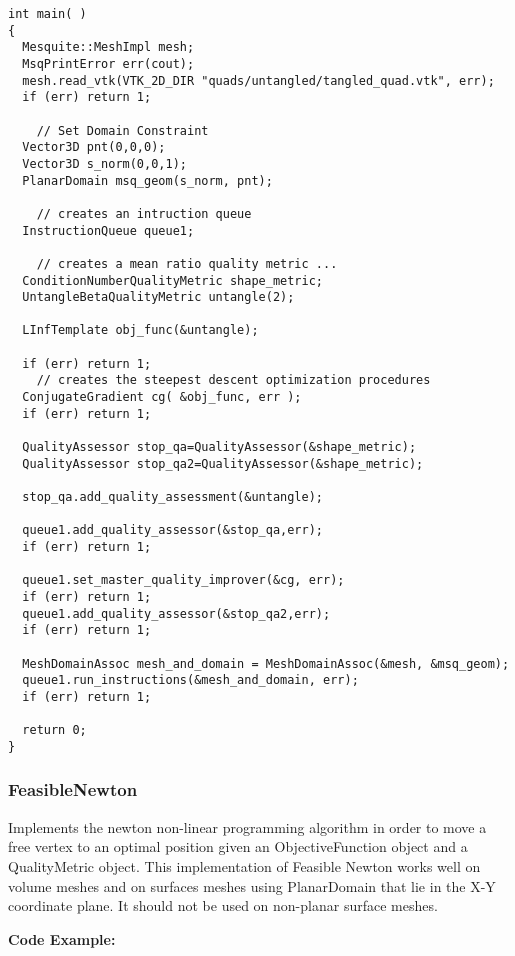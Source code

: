 \begin{lstlisting}[frame=single]
int main( )
{
  Mesquite::MeshImpl mesh;
  MsqPrintError err(cout);
  mesh.read_vtk(VTK_2D_DIR "quads/untangled/tangled_quad.vtk", err);
  if (err) return 1;
  
    // Set Domain Constraint
  Vector3D pnt(0,0,0);
  Vector3D s_norm(0,0,1);
  PlanarDomain msq_geom(s_norm, pnt);
                                                                              
    // creates an intruction queue
  InstructionQueue queue1;
  
    // creates a mean ratio quality metric ...
  ConditionNumberQualityMetric shape_metric;
  UntangleBetaQualityMetric untangle(2);

  LInfTemplate obj_func(&untangle);

  if (err) return 1;
    // creates the steepest descent optimization procedures
  ConjugateGradient cg( &obj_func, err );
  if (err) return 1;
  
  QualityAssessor stop_qa=QualityAssessor(&shape_metric);
  QualityAssessor stop_qa2=QualityAssessor(&shape_metric);
   
  stop_qa.add_quality_assessment(&untangle);

  queue1.add_quality_assessor(&stop_qa,err); 
  if (err) return 1;
 
  queue1.set_master_quality_improver(&cg, err);
  if (err) return 1;
  queue1.add_quality_assessor(&stop_qa2,err);
  if (err) return 1;

  MeshDomainAssoc mesh_and_domain = MeshDomainAssoc(&mesh, &msq_geom);
  queue1.run_instructions(&mesh_and_domain, err);
  if (err) return 1;
  
  return 0;
}
\end{lstlisting}


\subsubsection{FeasibleNewton}
Implements the newton non-linear programming algorithm in order to move a free vertex to an optimal position given an ObjectiveFunction object and a QualityMetric object.  This implementation of Feasible Newton works well on volume meshes and on surfaces meshes using PlanarDomain that lie in the X-Y coordinate plane. It should not be used on non-planar surface meshes.

\textbf{Code Example:}

